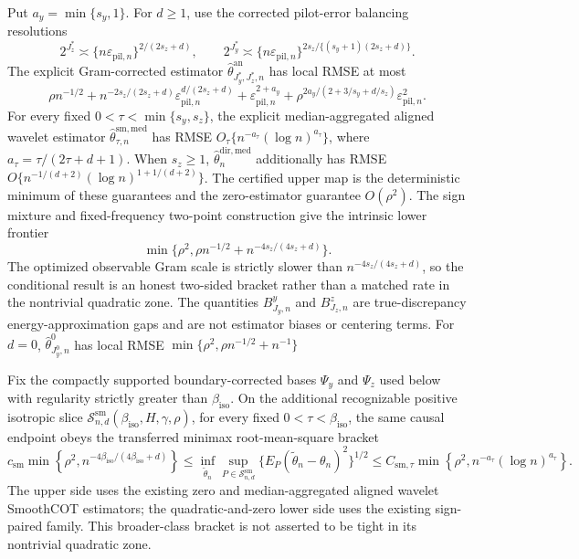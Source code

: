 Put \(a_y=\min\{s_y,1\}\). For \(d\ge1\), use the corrected pilot-error balancing resolutions
\[
2^{J_z^*}\asymp\{n\varepsilon_{\mathrm{pil},n}\}^{2/(2s_z+d)},
\qquad
2^{J_y^*}\asymp\{n\varepsilon_{\mathrm{pil},n}\}^{2s_z/\{(s_y+1)(2s_z+d)\}}.
\]
The explicit Gram-corrected estimator \(\widehat\theta^{\mathrm{an}}_{J_y^*,J_z^*,n}\) has local RMSE at most
\[
\rho n^{-1/2}
+n^{-2s_z/(2s_z+d)}\varepsilon_{\mathrm{pil},n}^{d/(2s_z+d)}
+\varepsilon_{\mathrm{pil},n}^{2+a_y}
+\rho^{2a_y/(2+3/s_y+d/s_z)}\varepsilon_{\mathrm{pil},n}^2.
\]
For every fixed \(0<\tau<\min\{s_y,s_z\}\), the explicit median-aggregated aligned wavelet estimator \(\widehat\theta^{\mathrm{sm,med}}_{\tau,n}\) has RMSE \(O_\tau\{n^{-a_\tau}(\log n)^{a_\tau}\}\), where \(a_\tau=\tau/(2\tau+d+1)\). When \(s_z\ge1\), \(\widehat\theta_n^{\mathrm{dir,med}}\) additionally has RMSE \(O\{n^{-1/(d+2)}(\log n)^{1+1/(d+2)}\}\). The certified upper map is the deterministic minimum of these guarantees and the zero-estimator guarantee \(O(\rho^2)\). The sign mixture and fixed-frequency two-point construction give the intrinsic lower frontier
\[
\min\{\rho^2,\rho n^{-1/2}+n^{-4s_z/(4s_z+d)}\}.
\]
The optimized observable Gram scale is strictly slower than \(n^{-4s_z/(4s_z+d)}\), so the conditional result is an honest two-sided bracket rather than a matched rate in the nontrivial quadratic zone.  The quantities \(B^y_{J_y,n}\) and \(B^z_{J_z,n}\) are true-discrepancy energy-approximation gaps and are not estimator biases or centering terms. For \(d=0\), \(\widehat\theta^0_{J_y^0,n}\) has local RMSE \(\min\{\rho^2,\rho n^{-1/2}+n^{-1}\}\)

Fix the compactly supported boundary-corrected bases \(\Psi_y\) and \(\Psi_z\) used below with regularity strictly greater than \(\beta_{\mathrm{iso}}\). On the additional recognizable positive isotropic slice \(\mathcal S^{\mathrm{sm}}_{n,d}(\beta_{\mathrm{iso}},H,\gamma,\rho)\), for every fixed \(0<\tau<\beta_{\mathrm{iso}}\), the same causal endpoint obeys the transferred minimax root-mean-square bracket
\[
c_{\mathrm{sm}}\min\!\left\{\rho^2,n^{-4\beta_{\mathrm{iso}}/(4\beta_{\mathrm{iso}}+d)}\right\}
\le \inf_{\widetilde\theta_n}\sup_{P\in\mathcal S^{\mathrm{sm}}_{n,d}}
\{E_P(\widetilde\theta_n-\theta_n)^2\}^{1/2}
\le C_{\mathrm{sm},\tau}\min\!\left\{\rho^2,n^{-a_\tau}(\log n)^{a_\tau}\right\}.
\]
The upper side uses the existing zero and median-aggregated aligned wavelet SmoothCOT estimators; the quadratic-and-zero lower side uses the existing sign-paired family. This broader-class bracket is not asserted to be tight in its nontrivial quadratic zone.